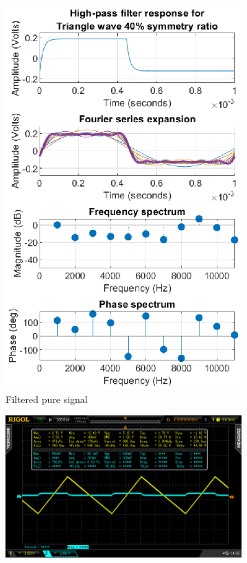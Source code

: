 \documentclass[notitlepage, a4paper, 11pt]{article}
\begin{document}
\begin{figure}[H]
\begin{subfigure}[][][t]{0.26\textwidth}
			\includegraphics[width=\textwidth]{../Matlab/img/RCHPtri40}
			\caption{Filtered pure signal}
		\end{subfigure}
		\hfill
		\begin{subfigure}[][][t]{0.45\textwidth}
			\includegraphics[width=\textwidth, trim=85 50 112 45, clip]{../img/osc/DS2_QuickPrint10.png}

\end{subfigure}
\end{figure}
\end{document}
